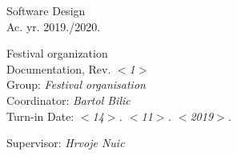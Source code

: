 \documentclass[12pt]{report}
\begin{document}
	

	\begin{titlepage}
		\begin{center}
			\LARGE Software Design\\
			\large Ac. yr. 2019./2020.\\
			
			
			\huge Festival organization\\
			\Large Documentation, Rev. \textit{$<$1$>$}\\
			
			\normalsize
			Group: \textit{Festival organisation}\\
			Coordinator: \textit{Bartol Bilic}\\
			
			
			Turn-in Date: \textit{$<$14$>$. $<$11$>$. $<$2019$>$.}\\
	
			
			Supervisor: \textit{Hrvoje Nuic}\\
		
		\end{center}

	
	\end{titlepage}

	
	\tableofcontents

	
	
	
	
	
	
	
	
	
	\begingroup
	\renewcommand*\listfigurename{Image and diagram index}
	\listoffigures
	\endgroup


	
	\eject 
		
	
\end{document}
